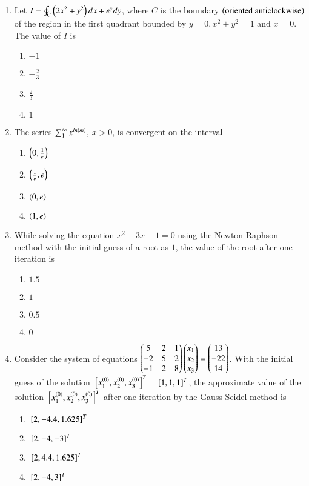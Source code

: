 \documentclass[journal,12pt,onecolumn]{IEEEtran}
\theoremstyle{remark}
\begin{document}
\begin{enumerate}
\item Let $I = \oint_{C}\left(2x^2 + y^2\right)dx + e^{y}dy$, where $C$ is the boundary $\left(\text{oriented anticlockwise}\right)$ of the region in the first quadrant bounded by $y=0,x^2 + y^2 = 1 \text{ and } x=0$. The value of $I$ is
\begin{enumerate}
\item $-1$
\item $-\frac{2}{3}$
\item $\frac{2}{3}$
\item $1$
\end{enumerate}

\item The series $\sum_{1}^{\infty} x^{ln\left(m\right)}$, $x>0$, is convergent on the interval
\begin{enumerate}
\item $\left(0,\frac{1}{e}\right)$
\item $\left(\frac{1}{e},e\right)$
\item $\left(0,e\right)$
\item $\left(1,e\right)$
\end{enumerate}

\item While solving the equation $x^2 - 3x + 1=0$ using the Newton-Raphson method with the initial guess of a root as $1$, the value of the root after one iteration is
\begin{enumerate}
\item $1.5$
\item $1$
\item $0.5$
\item $0$
\end{enumerate}

\item Consider the system of equations
$\begin{pmatrix}5 & 2 & 1\\-2 & 5 & 2\\-1 & 2 & 8\end{pmatrix}\begin{pmatrix}x_1\\x_2\\x_3\end{pmatrix}=\begin{pmatrix}13\\-22\\14\end{pmatrix}$.
With the initial guess of the solution ${}\left[x_{1}^{\left(0\right)},x_{2}^{\left(0\right)},x_{3}^{\left(0\right)}\right]^{T} = {}\left[1,1,1\right]^{T}$, the approximate value of the solution ${}\left[x_{1}^{\left(0\right)},x_{2}^{\left(0\right)},x_{3}^{\left(0\right)}\right]^{T}$ after one iteration by the Gauss-Seidel method is
\begin{enumerate}
\item ${}\left[2,-4.4,1.625\right]^{T}$
\item ${}\left[2,-4,-3\right]^{T}$
\item ${}\left[2,4.4,1.625\right]^{T}$
\item ${}\left[2,-4,3\right]^{T}$
\end{enumerate}


\end{enumerate}
\end{document}
